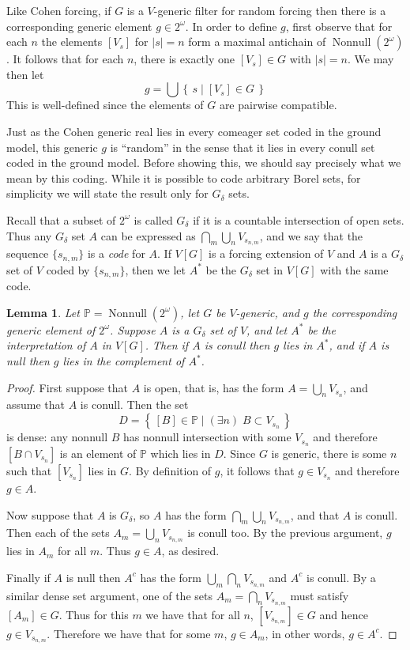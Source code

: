 \documentclass[11pt,oneside]{amsbook}
\newcommand{\set}[1]{\left\{\,#1\,\right\}}
\newcommand{\PP}{\mathbb P}
\DeclareMathOperator{\Nonnull}{Nonnull}
\theoremstyle{definition}
\theoremstyle{plain}
\newtheorem{lemma}[theorem]{Lemma}
\theoremstyle{definition}
\theoremstyle{remark}
\numberwithin{equation}{section}
\numberwithin{figure}{section}
\begin{document}
Like Cohen forcing, if $G$ is a $V$-generic filter for random forcing then there is a corresponding generic element $g\in2^\omega$. In order to define $g$, first observe that for each $n$ the elements $[V_s]$ for $|s|=n$ form a maximal antichain of $\Nonnull(2^\omega)$. It follows that for each $n$, there is exactly one $[V_s]\in G$ with $|s|=n$. We may then let
\[g=\bigcup\set{s\mid [V_s]\in G}
\]
This is well-defined since the elements of $G$ are pairwise compatible.

Just as the Cohen generic real lies in every comeager set coded in the ground model, this generic $g$ is ``random'' in the sense that it lies in every conull set coded in the ground model. Before showing this, we should say precisely what we mean by this coding. While it is possible to code arbitrary Borel sets, for simplicity we will state the result only for $G_\delta$ sets. 

Recall that a subset of $2^\omega$ is called $G_\delta$ if it is a countable intersection of open sets. Thus any $G_\delta$ set $A$ can be expressed as $\bigcap_m\bigcup_nV_{s_{n,m}}$, and we say that the sequence $\{s_{n,m}\}$ is a \emph{code} for $A$. If $V[G]$ is a forcing extension of $V$ and $A$ is a $G_\delta$ set of $V$ coded by $\{s_{n,m}\}$, then we let $A^*$ be the $G_\delta$ set in $V[G]$ with the same code.

\begin{lemma}
  \label{lem:random-conull}
  Let $\PP=\Nonnull(2^\omega)$, let $G$ be $V$-generic, and $g$ the corresponding generic element of $2^\omega$. Suppose $A$ is a $G_\delta$ set of $V$, and let $A^*$ be the interpretation of $A$ in $V[G]$. Then if $A$ is conull then $g$ lies in $A^*$, and if $A$ is null then $g$ lies in the complement of $A^*$.
\end{lemma}

\begin{proof}
  First suppose that $A$ is open, that is, has the form $A=\bigcup_nV_{s_n}$, and assume that $A$ is conull. Then the set
  \[D=\set{[B]\in\PP\mid (\exists n)\;B\subset V_{s_n}}
  \]
  is dense: any nonnull $B$ has nonnull intersection with some $V_{s_n}$ and therefore $[B\cap V_{s_n}]$ is an element of $\PP$ which lies in $D$. Since $G$ is generic, there is some $n$ such that $[V_{s_n}]$ lies in $G$. By definition of $g$, it follows that $g\in V_{s_n}$ and therefore $g\in A$.

  Now suppose that $A$ is $G_\delta$, so $A$ has the form $\bigcap_m\bigcup_nV_{s_{n,m}}$, and that $A$ is conull. Then each of the sets $A_m=\bigcup_nV_{s_{n,m}}$ is conull too. By the previous argument, $g$ lies in $A_m$ for all $m$. Thus $g\in A$, as desired.

  Finally if $A$ is null then $A^c$ has the form $\bigcup_m\bigcap_nV_{s_{n,m}}$ and $A^c$ is conull. By a similar dense set argument, one of the sets $A_m=\bigcap_nV_{s_{n,m}}$ must satisfy $[A_m]\in G$. Thus for this $m$ we have that for all $n$, $[V_{s_{n,m}}]\in G$ and hence $g\in V_{s_{n,m}}$. Therefore we have that for some $m$, $g\in A_m$, in other words, $g\in A^c$.
\end{proof}
\end{document}
